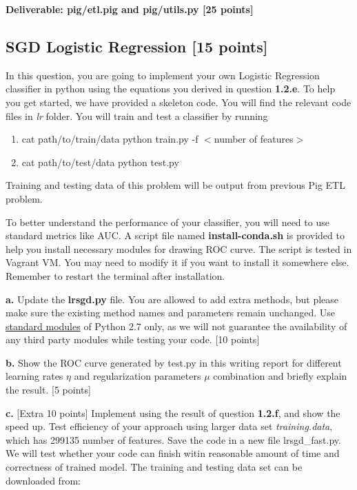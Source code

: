 \documentclass[12pt]{article}
\begin{document}
\textbf{Deliverable: pig/etl.pig and pig/utils.py [25 points]}

\subsection{SGD Logistic Regression [15 points]}
In this question, you are going to implement your own Logistic Regression classifier in python using the equations you derived in question \textbf{1.2.e}. To help you get started, we have provided a skeleton code. You will find the relevant code files in \textit{lr} folder. You will train and test a classifier by running 
\begin{enumerate}
\item cat path/to/train/data \textbar{} python train.py -f $<$number of features$>$
\item cat path/to/test/data \textbar{} python test.py 
\end{enumerate}
Training and testing data of this problem will be output from previous Pig ETL problem.

To better understand the performance of your classifier, you will need to use standard metrics like AUC. A script file named \textbf{install-conda.sh} is provided to help you install necessary modules for drawing ROC curve. The script is tested in Vagrant VM. You may need to modify it if you want to install it somewhere else. Remember to restart the terminal after installation.

\textbf{a.} Update the \textbf{lrsgd.py} file. You are allowed to add extra methods, but please make sure the existing method names and parameters remain unchanged. Use \href{https://docs.python.org/2/library/}{standard modules} of Python 2.7 only, as we will not guarantee the availability of any third party modules while testing your code. [10 points]

\textbf{b.} Show the ROC curve generated by test.py in this writing report for different learning rates $\eta$ and regularization parameters $\mu$ combination and briefly explain the result. [5 points]

\textbf{c.} [Extra 10 points] Implement using the result of question \textbf{1.2.f}, and show the speed up. Test efficiency of your approach using larger data set \textit{training.data}, which has 299135 number of features. Save the code in a new file lrsgd\_fast.py. We will test whether your code can finish witin reasonable amount of time and correctness of trained model. The training and testing data set can be downloaded from:
\end{document}
